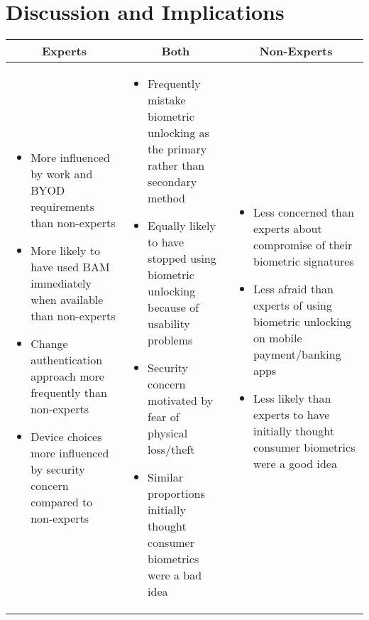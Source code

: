 \section{Discussion and Implications}


\begin{table*}[t]
\scriptsize

\begin{tabularx}{\textwidth}{ X | X | X }
     \multicolumn{1}{c|}{\bf Experts} & \multicolumn{1}{c|}{\bf Both} & \multicolumn{1}{c}{\bf Non-Experts} \\
    \midrule
    \begin{itemize}
    \item More influenced by work and BYOD requirements than non-experts
    \item More likely to have used BAM immediately when available than non-experts
    \item Change authentication approach more frequently than non-experts
    \item Device choices more influenced by security concern compared to non-experts
    \end{itemize} 
    &
    \begin{itemize}
    \item Frequently mistake biometric unlocking as the primary rather than secondary method
    \item Equally likely to have stopped using biometric unlocking because of usability problems
    \item Security concern motivated by fear of physical loss/theft
    \item Similar proportions initially thought consumer biometrics were a bad idea
    \end{itemize} 
    & 
    \begin{itemize}
    \item Less concerned than experts about compromise of their biometric signatures
    \item Less afraid than experts of using biometric unlocking on mobile payment/banking apps
    \item Less likely than experts to have initially thought consumer biometrics were a good idea
    \end{itemize} 
    \\


\end{tabularx}
\end{table*}
